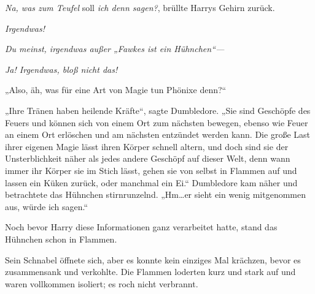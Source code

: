 \emph{Na, was zum Teufel} soll \emph{ich denn sagen?}, brüllte Harrys Gehirn zurück.

\emph{Irgendwas!}

\emph{Du meinst, irgendwas außer „Fawkes ist ein Hühnchen“—}

\emph{Ja! Irgendwas, bloß nicht das!}

„Also, äh, was für eine Art von Magie tun Phönixe denn?“

„Ihre Tränen haben heilende Kräfte“, sagte Dumbledore. „Sie sind Geschöpfe des Feuers und können sich von einem Ort zum nächsten bewegen, ebenso wie Feuer an einem Ort erlöschen und am nächsten entzündet werden kann. Die große Last ihrer eigenen Magie lässt ihren Körper schnell altern, und doch sind sie der Unsterblichkeit näher als jedes andere Geschöpf auf dieser Welt, denn wann immer ihr Körper sie im Stich lässt, gehen sie von selbst in Flammen auf und lassen ein Küken zurück, oder manchmal ein Ei.“ Dumbledore kam näher und betrachtete das Hühnchen stirnrunzelnd. „Hm…er sieht ein wenig mitgenommen aus, würde ich sagen.“

Noch bevor Harry diese Informationen ganz verarbeitet hatte, stand das Hühnchen schon in Flammen.

Sein Schnabel öffnete sich, aber es konnte kein einziges Mal krächzen, bevor es zusammensank und verkohlte. Die Flammen loderten kurz und stark auf und waren vollkommen isoliert; es roch nicht verbrannt.


